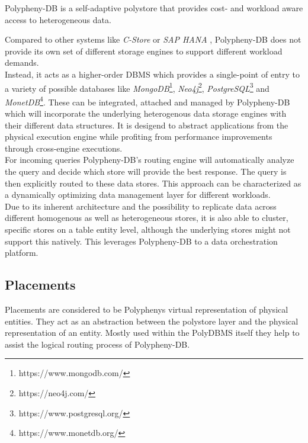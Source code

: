 Polypheny-DB is a self-adaptive polystore that provides cost- and workload aware access to heterogeneous data\cite{poly2020}.

Compared to other systems like \textit{C-Store}\cite{cstore_2005} or \textit{SAP HANA} \cite{hana_2012}, 
Polypheny-DB does not provide its own set of different storage engines to support 
different workload demands.\\
Instead, it acts as a higher-order DBMS which provides a single-point of entry to 
a variety of possible databases like 
\textit{MongoDB}\footnote{https://www.mongodb.com/}, 
\textit{Neo4j}\footnote{https://neo4j.com/},
\textit{PostgreSQL}\footnote{https://www.postgresql.org/} 
and \textit{MonetDB}\footnote{https://www.monetdb.org/}. 
These can be integrated, attached and managed by Polypheny-DB which will incorporate the underlying 
heterogenous data storage engines with their different data structures. 
It is desigend to abstract applications from the physical execution engine while profiting from 
performance improvements through cross-engine executions. 
\\
For incoming queries Polypheny-DB's routing engine will automatically analyze the query and decide 
which store will provide the best response. The query is then explicitly routed to these data stores. 
This approach can be characterized as a dynamically optimizing data management layer for different workloads.\\
Due to its inherent architecture and the possibility to replicate data across different homogenous as well as heterogeneous stores, it is also able to cluster, specific stores 
on a table entity level, although the underlying stores might not support this natively. 
This leverages Polypheny-DB to a data orchestration platform. 





\subsection{Placements}
Placements are considered to be Polyphenys virtual representation of physical entities.
They act as an abstraction between the polystore layer and the physical representation of an entity. 
Mostly used within the PolyDBMS itself they help to assist the logical routing process of Polypheny-DB.



